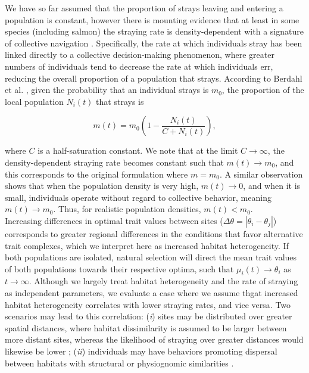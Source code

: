\documentclass{revtex4}
\begin{document}
\noindent We have so far assumed that the proportion of strays leaving and entering a population is constant, however there is mounting evidence that at least in some species (including salmon) the straying rate is density-dependent with a signature of collective navigation \citep{Berdahl:2016dx,Bett:2017ha}.
Specifically, the rate at which individuals stray has been linked directly to a collective decision-making phenomenon, where greater numbers of individuals tend to decrease the rate at which individuals err, reducing the overall proportion of a population that strays.
According to Berdahl et al. \citep{Berdahl:2014bl,Berdahl:2016dx}, given the probability that an individual strays is $m_0$, the proportion of the local population $N_i(t)$ that strays is

\begin{equation}
  m(t) = m_0\left(1- \frac{N_i(t)}{C+N_i(t)}\right),
  \label{eq:ddm}
\end{equation}

\noindent where $C$ is a half-saturation constant.
We note that at the limit $C\rightarrow \infty$, the density-dependent straying rate becomes constant such that $m(t) \rightarrow m_0$, and this corresponds to the original formulation where $m=m_0$.
A similar observation shows that when the population density is very high, $m(t) \rightarrow 0$, and when it is small, individuals operate without regard to collective behavior, meaning $m(t) \rightarrow m_0$.
Thus, for realistic population densities, $m(t) < m_0$.\\


\noindent Increasing differences in optimal trait values between sites ($\Delta\theta = \left|\theta_i - \theta_j\right|$) corresponds to greater regional differences in the conditions that favor alternative trait complexes, which we interpret here as increased habitat heterogeneity.
If both populations are isolated, natural selection will direct the mean trait values of both populations towards their respective optima, such that $\mu_i(t) \rightarrow \theta_i$ as $t\rightarrow\infty$.
Although we largely treat habitat heterogeneity and the rate of straying as independent parameters, we evaluate a case where we assume thgat increased habitat heterogeneity correlates with lower straying rates, and vice versa.
Two scenarios may lead to this correlation: 
(\emph{i}) sites may be distributed over greater spatial distances, where habitat dissimilarity is assumed to be larger between more distant sites, whereas the likelihood of straying over greater distances would likewise be lower \citep{Candy:2000hu,JPE:JPE1383};
(\emph{ii}) individuals may have behaviors promoting dispersal between habitats with structural or physiognomic similarities \citep{Peterson:2014gy}.
\end{document}
